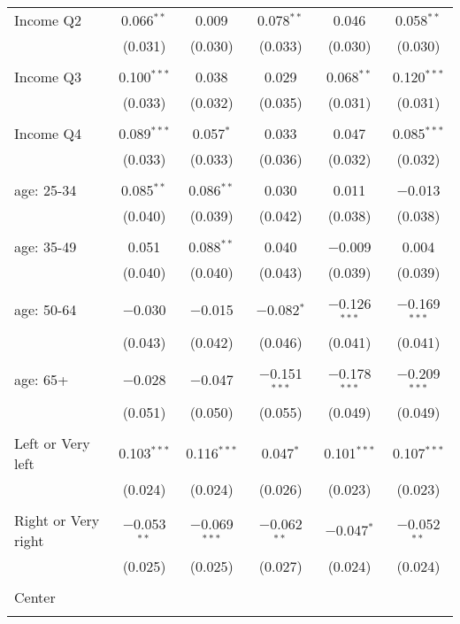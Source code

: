 \begin{tabular}{@{\extracolsep{5pt}}lccccc}
 Income Q2 & 0.066$^{**}$ & 0.009 & 0.078$^{**}$ & 0.046 & 0.058$^{**}$ \\ 
  & (0.031) & (0.030) & (0.033) & (0.030) & (0.030) \\ 
  & & & & & \\ 
 Income Q3 & 0.100$^{***}$ & 0.038 & 0.029 & 0.068$^{**}$ & 0.120$^{***}$ \\ 
  & (0.033) & (0.032) & (0.035) & (0.031) & (0.031) \\ 
  & & & & & \\ 
 Income Q4 & 0.089$^{***}$ & 0.057$^{*}$ & 0.033 & 0.047 & 0.085$^{***}$ \\ 
  & (0.033) & (0.033) & (0.036) & (0.032) & (0.032) \\ 
  & & & & & \\ 
 age: 25-34 & 0.085$^{**}$ & 0.086$^{**}$ & 0.030 & 0.011 & $-$0.013 \\ 
  & (0.040) & (0.039) & (0.042) & (0.038) & (0.038) \\ 
  & & & & & \\ 
 age: 35-49 & 0.051 & 0.088$^{**}$ & 0.040 & $-$0.009 & 0.004 \\ 
  & (0.040) & (0.040) & (0.043) & (0.039) & (0.039) \\ 
  & & & & & \\ 
 age: 50-64 & $-$0.030 & $-$0.015 & $-$0.082$^{*}$ & $-$0.126$^{***}$ & $-$0.169$^{***}$ \\ 
  & (0.043) & (0.042) & (0.046) & (0.041) & (0.041) \\ 
  & & & & & \\ 
 age: 65+ & $-$0.028 & $-$0.047 & $-$0.151$^{***}$ & $-$0.178$^{***}$ & $-$0.209$^{***}$ \\ 
  & (0.051) & (0.050) & (0.055) & (0.049) & (0.049) \\ 
  & & & & & \\ 
 Left or Very left & 0.103$^{***}$ & 0.116$^{***}$ & 0.047$^{*}$ & 0.101$^{***}$ & 0.107$^{***}$ \\ 
  & (0.024) & (0.024) & (0.026) & (0.023) & (0.023) \\ 
  & & & & & \\ 
 Right or Very right & $-$0.053$^{**}$ & $-$0.069$^{***}$ & $-$0.062$^{**}$ & $-$0.047$^{*}$ & $-$0.052$^{**}$ \\ 
  & (0.025) & (0.025) & (0.027) & (0.024) & (0.024) \\ 
  & & & & & \\ 
 Center &  &  &  &  &  \\ 
  &  &  &  &  &  \\ 

\end{tabular}
